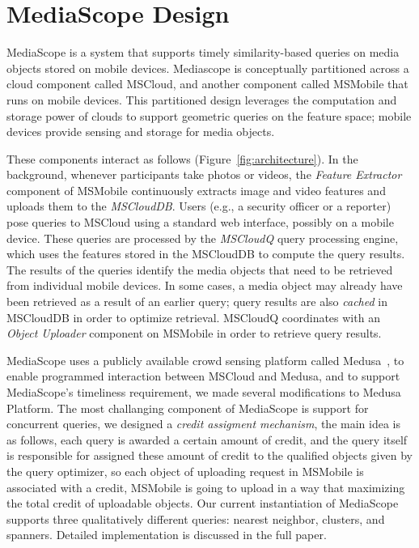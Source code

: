 \section{MediaScope Design}
MediaScope is a system that supports timely similarity-based queries
on media objects stored on mobile devices.
%
Mediascope is conceptually partitioned across a cloud component called
MSCloud, and another component called MS\-Mobile that runs on mobile devices.
%
This partitioned design leverages the computation and storage power of
clouds to support geometric queries on the feature space; mobile
devices provide sensing and storage for media objects.

These components interact as follows (Figure~\ref{fig:architecture}).
%
In the background, whenever participants take photos or videos, the
\emph{Feature Extractor} component of MSMobile continuously extracts
image and video features and uploads them to the \emph{MSCloudDB}.
%
Users (e.g., a security officer or a reporter) pose queries to MSCloud
using a standard web interface, possibly on a mobile device.
%
These queries are processed by the \emph{MSCloudQ} query processing
engine, which uses the features stored in the MSCloudDB to compute the
query results.
%
The results of the queries identify the media objects that need to be
retrieved from individual mobile devices.
%
In some cases, a media object may already have been retrieved as a
result of an earlier query; query results are also \emph{cached} in
MSCloudDB in order to optimize retrieval.
%
MSCloudQ coordinates with an \emph{Object Uploader} component on
MSMobile in order to retrieve query results.

MediaScope uses a publicly available crowd sensing platform called
Medusa~\cite{Medusa}, to enable programmed interaction between MSCloud and Medusa, and to support MediaScope's timeliness requirement, we made several modifications to Medusa Platform.
%
The most challanging component of MediaScope is support for concurrent queries, we designed a \emph{credit assigment mechanism}, the main idea is as follows, each query is awarded a certain amount of credit, and the query itself is responsible for assigned these amount of credit to the qualified objects given by the query optimizer, so each object of uploading request in MSMobile is associated with a credit, MSMobile is going to upload in a way that maximizing the total credit of uploadable objects.
%
Our current instantiation of MediaScope supports three qualitatively
different queries: nearest neighbor, clusters, and spanners. Detailed implementation is discussed in the full paper.

